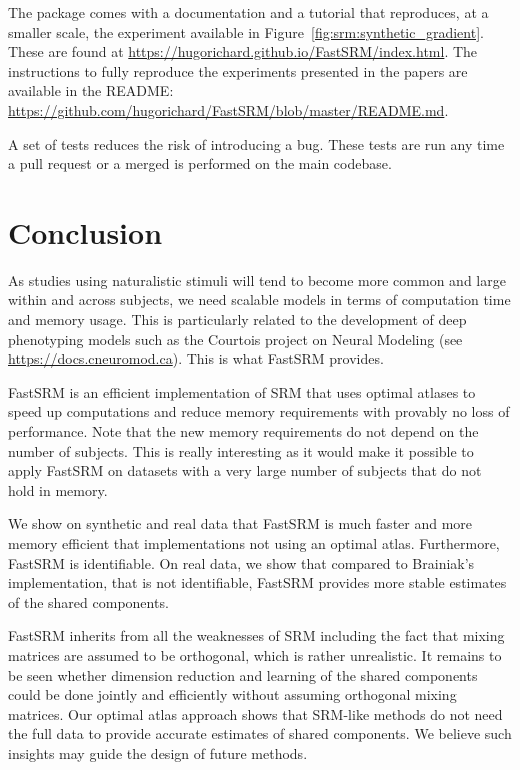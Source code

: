 \documentclass{article}
\begin{document}
The package comes with a documentation and a tutorial that reproduces, at a
smaller scale, the experiment available in Figure~\ref{fig:srm:synthetic_gradient}.
These are found at \url{https://hugorichard.github.io/FastSRM/index.html}.
The instructions to fully reproduce the experiments presented in the papers are
available in the README:
\url{https://github.com/hugorichard/FastSRM/blob/master/README.md}.

A set of tests reduces the risk of introducing a bug. These tests are run any
time a pull request or a merged is performed on the main codebase.

\section{Conclusion}
As studies using naturalistic stimuli will tend to become more common and large
within and across subjects, we need scalable models in terms of computation time
and memory usage.
%
This is particularly related to the development of deep phenotyping
models such as the Courtois project on Neural Modeling (see \url{https://docs.cneuromod.ca}).
%
This is what FastSRM provides.

%
FastSRM is an efficient implementation of SRM
that uses optimal atlases to speed up computations and reduce memory requirements
with provably no loss of performance. 
Note that the new memory requirements do not depend on the number of subjects.
This is really interesting as it would make it possible to apply FastSRM on
datasets with a very large number of subjects that do not hold in memory.


We show on synthetic and real data that FastSRM is much faster and more memory
efficient that implementations not using an optimal atlas.
Furthermore, FastSRM is identifiable. On real data, we show that compared to
Brainiak's implementation, that is not identifiable, FastSRM provides more
stable estimates of the shared components.


%
FastSRM inherits from all the weaknesses of SRM including the fact that
mixing matrices are assumed to be orthogonal, which is rather unrealistic. It
remains to be seen whether dimension reduction and learning of the shared
components could be done jointly and efficiently without assuming orthogonal
mixing matrices.
%
Our optimal atlas approach shows that SRM-like methods do not need the
full data to provide accurate estimates of shared components. We believe such
insights may guide the design of future methods.
%
\end{document}
